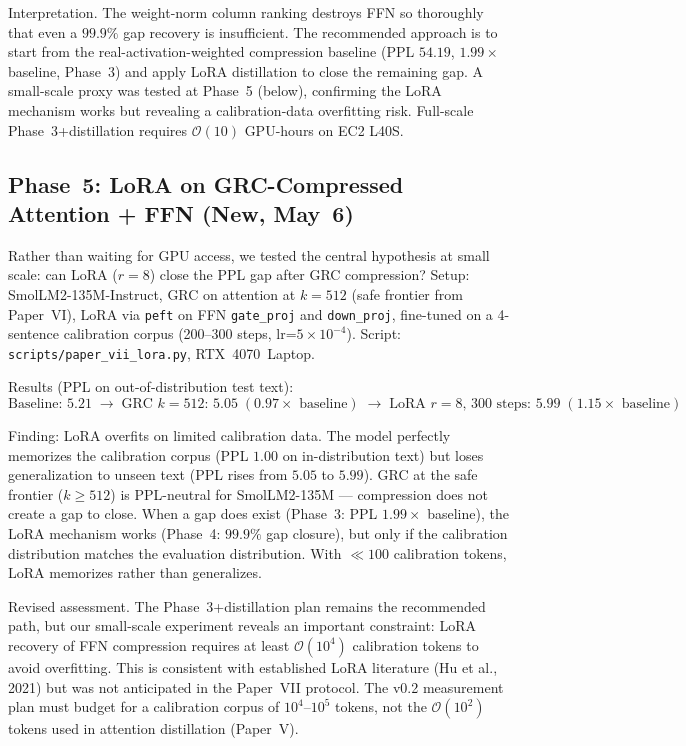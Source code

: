 \documentclass[11pt]{article}
\begin{document}
Interpretation.  The weight-norm column ranking destroys FFN
so thoroughly that even a $99.9\%$ gap recovery is insufficient.
The recommended approach is to start from the real-activation-weighted
compression baseline (PPL $54.19$, $1.99{\times}$ baseline, Phase~3)
and apply LoRA distillation to close the remaining gap.  A small-scale
proxy was tested at Phase~5 (below), confirming the LoRA mechanism
works but revealing a calibration-data overfitting risk.  Full-scale
Phase~3+distillation requires $\mathcal{O}(10)$ GPU-hours on EC2 L40S.

\subsection{Phase~5: LoRA on GRC-Compressed Attention + FFN (New, May~6)}

Rather than waiting for GPU access, we tested the central hypothesis
at small scale: can LoRA ($r{=}8$) close the PPL gap after GRC
compression?  Setup: SmolLM2-135M-Instruct, GRC on attention at
$k{=}512$ (safe frontier from Paper~VI), LoRA via \texttt{peft} on
FFN \texttt{gate\_proj} and \texttt{down\_proj}, fine-tuned on a
4-sentence calibration corpus (200--300 steps, lr=${5}{\times}10^{-4}$).
Script: \texttt{scripts/paper\_vii\_lora.py}, RTX~4070~Laptop.

Results (PPL on out-of-distribution test text):
\[
\text{Baseline: } 5.21 \;\rightarrow\;
\text{GRC $k{=}512$: } 5.05 \; (0.97{\times}\text{ baseline}) \;\rightarrow\;
\text{LoRA $r{=}8$, 300~steps: } 5.99 \; (1.15{\times}\text{ baseline})
\]

Finding: LoRA overfits on limited calibration data.  The
model perfectly memorizes the calibration corpus (PPL $1.00$ on
in-distribution text) but loses generalization to unseen text
(PPL rises from $5.05$ to $5.99$).  GRC at the safe frontier ($k{\ge}512$)
is PPL-neutral for SmolLM2-135M --- compression does not create a gap to
close.  When a gap does exist (Phase~3: PPL $1.99{\times}$ baseline),
the LoRA mechanism works (Phase~4: $99.9\%$ gap closure), but
only if the calibration distribution matches the evaluation
distribution.  With ${\ll}100$ calibration tokens, LoRA memorizes
rather than generalizes.

Revised assessment.  The Phase~3+distillation plan remains
the recommended path, but our small-scale experiment reveals an
important constraint: LoRA recovery of FFN compression requires at
least $\mathcal{O}(10^4)$ calibration tokens to avoid overfitting.
This is consistent with established LoRA literature (Hu et al., 2021)
but was not anticipated in the Paper~VII protocol.  The v0.2 measurement
plan must budget for a calibration corpus of $10^4$--$10^5$ tokens,
not the $\mathcal{O}(10^2)$ tokens used in attention distillation
(Paper~V).
\end{document}
